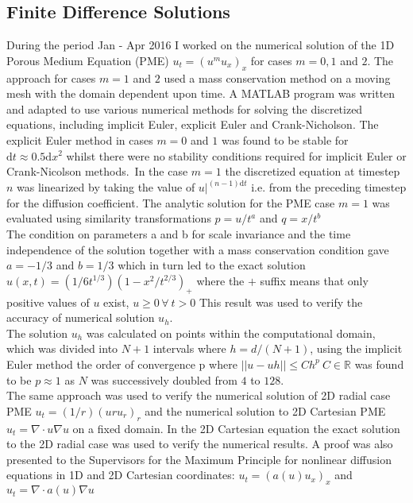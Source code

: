 \documentclass[11pt]{article}
\newcommand{\rd}{\mathrm{d}}
\begin{document}
\subsection{Finite Difference Solutions}
During the period Jan - Apr 2016 I worked on the numerical solution of the 1D Porous Medium Equation (PME) $u_t = (u^mu_x)_x $ for cases $m = 0,1$ and $2$.
The approach for cases $m = 1$ and $2$ used a mass conservation method on a moving mesh with the domain dependent upon time. A MATLAB program was written and adapted to use various numerical methods for solving the discretized equations, including  implicit Euler, explicit Euler and Crank-Nicholson.
The explicit Euler method in cases $m = 0$ and $1$ was found to be stable for $ \rd{t}\approx 0.5{\rd{x^2}} $ whilst there were no stability conditions required for implicit Euler or Crank-Nicolson methods.\
In the case $m = 1 $ the discretized equation at timestep $n$ was linearized by taking the value of ${u|}^{(n-1)\rd{t}}$ i.e. from the preceding timestep for the diffusion coefficient. The analytic solution for the PME case $m = 1$ was evaluated using similarity transformations $p = u/t^a $ and $q = x/t^b$\\
The condition on parameters a and b for scale invariance and the time independence of the solution together with a mass conservation condition gave $a = -1/3 $ and $ b = 1/3$ which in turn led to the exact solution $ u(x,t)=(1/6{t^{1/3}})(1-{x^2}/{t^{2/3}})_{+}  $ where the $ + $ suffix means that only positive values of $ u $ exist, $ u \geq 0\,\forall\  t> 0 $
This result was used to verify the accuracy of numerical solution $u_h$.\\
The  solution $u_h$ was calculated on points within the computational domain, which was divided into $N+1$ intervals where $h = d/(N+1) $, using the implicit Euler method the order of convergence p where $||u-uh|| \leq Ch^p\ C\in \mathbb{R} $ was found to be $ p\approx 1$ as $N $ was successively doubled from $4$ to $128$.\\
The same approach was used to verify the numerical solution of 2D radial case PME 
$ u_t = (1/r){(uru_r )}_r  $ and the numerical solution to 2D Cartesian PME 
$ u_t = \nabla\cdot{u}\nabla{u} $ on a fixed domain. In the 2D Cartesian equation the exact solution to the 2D radial case was used to verify the numerical results.
A proof was also presented to the Supervisors for the Maximum Principle for nonlinear diffusion equations in 1D and 2D Cartesian coordinates: $ u_t = (a(u)u_x)_x $  and $ u_t = \nabla\cdot{a(u)}\nabla{u} $ 
\end{document}
